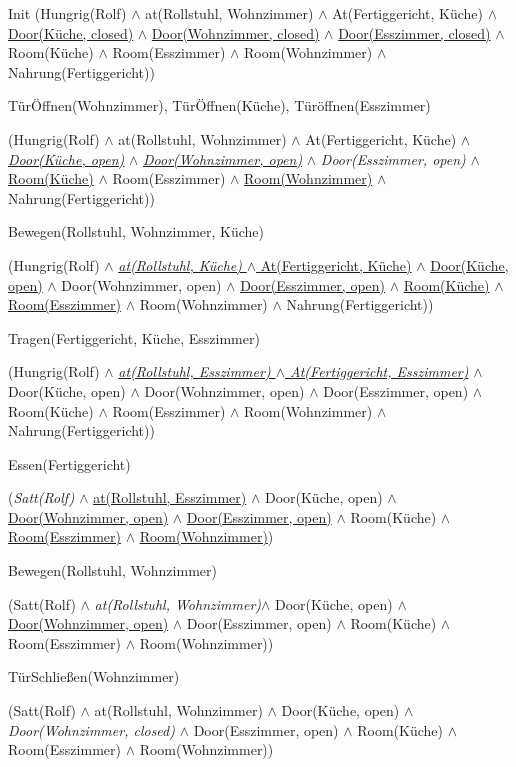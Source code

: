\documentclass{../Vorlage/mat}
\begin{document}
Init (Hungrig(Rolf) $\wedge$ at(Rollstuhl, Wohnzimmer) $\wedge$ At(Fertiggericht, Küche) $\wedge$ \underline{Door(Küche, closed)} $\wedge$ \underline{Door(Wohnzimmer, closed)} $\wedge$ \underline{Door(Esszimmer, closed)} $\wedge$ Room(Küche) $\wedge$ Room(Esszimmer) $\wedge$ Room(Wohnzimmer) $\wedge$ Nahrung(Fertiggericht))

TürÖffnen(Wohnzimmer), TürÖffnen(Küche), Türöffnen(Esszimmer)

(Hungrig(Rolf) $\wedge$ at(Rollstuhl, Wohnzimmer) $\wedge$ At(Fertiggericht, Küche) $\wedge$ \textit{\underline{Door(Küche, open)}} $\wedge$ \textit{\underline{Door(Wohnzimmer, open)}} $\wedge$ \textit{Door(Esszimmer, open)} $\wedge$ \underline{Room(Küche)} $\wedge$ Room(Esszimmer) $\wedge$ \underline{Room(Wohnzimmer)} $\wedge$ Nahrung(Fertiggericht))

Bewegen(Rollstuhl, Wohnzimmer, Küche)

(Hungrig(Rolf) $\wedge$ \underline{\textit{at(Rollstuhl, Küche)} $\wedge$ At(Fertiggericht, Küche)} $\wedge$ \underline{Door(Küche, open)} $\wedge$ Door(Wohnzimmer, open) $\wedge$ \underline{Door(Esszimmer, open)} $\wedge$ \underline{Room(Küche)} $\wedge$ \underline{Room(Esszimmer)} $\wedge$ Room(Wohnzimmer) $\wedge$ Nahrung(Fertiggericht))

Tragen(Fertiggericht, Küche, Esszimmer)

(Hungrig(Rolf) $\wedge$ \underline{\textit{at(Rollstuhl, Esszimmer) $\wedge$ At(Fertiggericht, Esszimmer)}} $\wedge$ Door(Küche, open) $\wedge$ Door(Wohnzimmer, open) $\wedge$ Door(Esszimmer, open) $\wedge$ Room(Küche) $\wedge$ Room(Esszimmer) $\wedge$ Room(Wohnzimmer) $\wedge$ Nahrung(Fertiggericht))

Essen(Fertiggericht)

(\textit{Satt(Rolf)} $\wedge$ \underline{at(Rollstuhl, Esszimmer)} $\wedge$ Door(Küche, open) $\wedge$ \underline{Door(Wohnzimmer, open)} $\wedge$ \underline{Door(Esszimmer, open)} $\wedge$ Room(Küche) $\wedge$ \underline{Room(Esszimmer)} $\wedge$ \underline{Room(Wohnzimmer)})

Bewegen(Rollstuhl, Wohnzimmer)

(Satt(Rolf) $\wedge$ \textit{at(Rollstuhl, Wohnzimmer)}$\wedge$ Door(Küche, open) $\wedge$ \underline{Door(Wohnzimmer, open)} $\wedge$ Door(Esszimmer, open) $\wedge$ Room(Küche) $\wedge$ Room(Esszimmer) $\wedge$ Room(Wohnzimmer))

TürSchließen(Wohnzimmer)

(Satt(Rolf) $\wedge$ at(Rollstuhl, Wohnzimmer) $\wedge$ Door(Küche, open) $\wedge$ \textit{Door(Wohnzimmer, closed)} $\wedge$ Door(Esszimmer, open) $\wedge$ Room(Küche) $\wedge$ Room(Esszimmer) $\wedge$ Room(Wohnzimmer))
\end{document}
